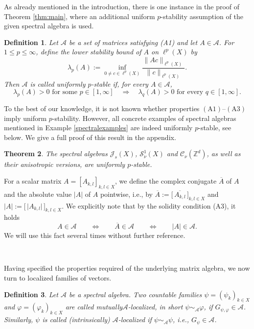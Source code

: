 \documentclass{amsart}
\newtheorem{theorem}{Theorem}
\newtheorem{def.}[theorem]{Definition}
\newcommand{\A}[0]{{\mathcal{A}}}
\newcommand{\MS}[0]{{\mathcal{S}}}
\begin{document}
As already mentioned in the introduction, there is one instance in the proof of Theorem \ref{thm:main}, where an additional uniform $p$-stability assumption of the given spectral algebra is used. 

\begin{def.}\label{def:p-stability}\cite{ShiSun09}
Let \(\mathcal A\) be a set of matrices satisfying (A1) and let \(A\in\mathcal A\). For \(1\leq p\leq\infty\), define the lower stability bound of \(A\) on \(\ell^p(X)\) by
\[
        \lambda_p(A)
        :=
        \inf_{0\neq c\in\ell^p(X)}
        \frac{\|Ac\|_{\ell^p(X)}}{\|c\|_{\ell^p(X)}}.
\]
Then \(\mathcal A\) is called \emph{uniformly $p$-stable} if, for every \(A\in\mathcal A\),
\[
        \lambda_p(A)>0
        \text{ for some }p\in[1,\infty]
        \quad\Longrightarrow\quad
        \lambda_q(A)>0
        \text{ for every }q\in[1,\infty].
\]
\end{def.}

To the best of our knowledge, it is not known whether properties \((\mathrm{A1})\)--\((\mathrm{A3})\) imply uniform $p$-stability. However, all concrete examples of spectral algebras mentioned in Example \ref{spectralexamples} are indeed uniformly $p$-stable, see below. We give a full proof of this result in the appendix.

\begin{theorem}
\label{thm:p-stable-examples}
The spectral algebras $\mathcal{J}_s(X)$, $\MS^1_{\nu}(X)$ and $\mathcal{C}_{\nu}(\mathbb{Z}^d)$, as well as their anisotropic versions, are uniformly $p$-stable.
\end{theorem}

For a scalar matrix $A= [A_{k,l}]_{k,l\in X}$, we define the complex conjugate $\overline{A}$ of $A$ and the absolute value $\vert A\vert$ of $A$ pointwise, i.e., by $\overline{A} := \big[\, \overline{A_{k,l}}\, \big]_{k,l\in X}$ and $\vert A\vert := \big[\, \vert A_{k,l}\vert\, \big]_{k,l\in X}$. We explicitly note that by the solidity condition (A3), it holds 
$$A\in \A \qquad \Longleftrightarrow \qquad \overline{A}\in \A \qquad \Longleftrightarrow \qquad \vert A \vert \in \A .$$
We will use this fact several times without further reference. 

\

Having specified the properties required of the underlying matrix algebra, we now turn to localized families of vectors. 

\begin{def.}\label{eq:Localisation_2_}\cite[Definition~3]{forngroech1}
Let $\A$ be a spectral algebra. Two countable families $\psi = (\psi_k)_{k\in X}$ and $\varphi = (\varphi_k)_{k\in X}$ are called \emph{mutually$\mathcal{A}$-localized}, in short $\psi\sim_\A \varphi$, if $G_{\psi,\varphi}\in\mathcal{A}$. Similarly, $\psi$ is called (intrinsically) $\A$-localized if $\psi\sim_\mathcal{A}\psi$, i.e., $G_{\psi}\in \A$. 
\end{def.}
\end{document}
